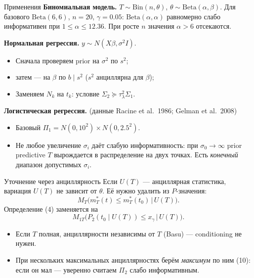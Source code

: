 \documentclass[aspectratio=169,10pt]{beamer}
\begin{document}
\begin{frame}{Применения}
  \textbf{Биномиальная модель.} $T\sim\mathrm{Bin}(n,\theta)$, $\theta\sim\mathrm{Beta}(\alpha,\beta)$.
  Для базового $\mathrm{Beta}(6,6)$, $n=20$, $\gamma=0.05$:
  $\mathrm{Beta}(\alpha,\alpha)$ равномерно слабо информативен при $1\le\alpha\le 12.36$.
  При росте $n$ значения $\alpha>6$ отсекаются.

  \vspace{0.3em}
  \textbf{Нормальная регрессия.} $y\sim N(X\beta,\sigma^2 I)$.
  \begin{itemize}
    \item Сначала проверяем prior на $\sigma^2$ по $s^2$;
    \item затем — на $\beta$ по $b\mid s^2$ ($s^2$ анциллярна для $\beta$);
    \item Заменяем $N_k$ на $t_k$: условие $\Sigma_2\succeq\tau_\lambda^2\Sigma_1$.
  \end{itemize}

  \vspace{0.3em}
  \textbf{Логистическая регрессия.} (данные Racine et al.\ 1986; Gelman et al.\ 2008)
  \begin{itemize}
    \item Базовый $\Pi_1=N(0,10^2)\times N(0,2.5^2)$.
    \item \alert{Не любое увеличение} $\sigma_i$ даёт слабую информативность:
          при $\sigma_0\to\infty$ prior predictive $T$ вырождается
          в распределение на двух точках. Есть \emph{конечный} диапазон допустимых $\sigma_i$.
  \end{itemize}
\end{frame}

\begin{frame}{Уточнение через анциллярность}
  Если $U(T)$ — анциллярная статистика, вариация $U(T)$ не зависит от $\theta$.
  Её нужно удалить из $P$-значения:
  \[
    M_T\bigl(m_T^*(t)\le m_T^*(t_0)\,\big|\,U(T)\bigr).
    \tag{9}
  \]
  Определение (4) заменяется на
  \[
    M_{1T}\bigl(P_2(t_0\mid U(T))\le x_\gamma \,\big|\, U(T)\bigr).
    \tag{10}
  \]
  \begin{itemize}
    \item Если $T$ полная, анциллярности независимы от $T$ (Basu) — conditioning не нужен.
    \item При нескольких максимальных анциллярностях берём \emph{максимум} по ним (10):
          если он мал — уверенно считаем $\Pi_2$ слабо информативным.
  \end{itemize}
\end{frame}
\end{document}
